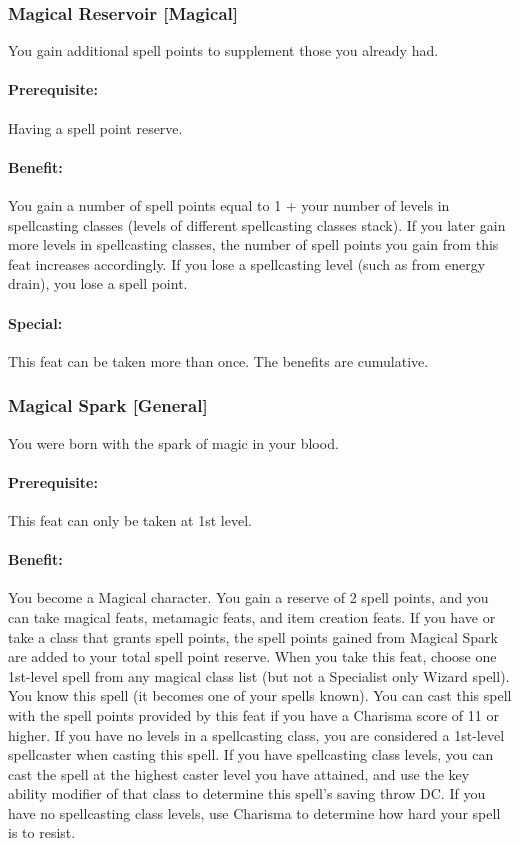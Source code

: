 \subsubsection[Magical Reservoir]{Magical Reservoir [Magical]}
\label{Feat:MagicallyGifted}
You gain additional spell points to supplement those you already had.

\paragraph{Prerequisite:} Having a spell point reserve.

\paragraph{Benefit:} You gain a number of spell points equal to 1 + your number of levels in spellcasting classes (levels of different spellcasting classes stack). If you later gain more levels in spellcasting classes, the number of spell points you gain from this feat increases accordingly. If you lose a spellcasting level (such as from energy drain), you lose a spell point.

\paragraph{Special:} This feat can be taken more than once. The benefits are cumulative.

\subsubsection[Magical Spark]{Magical Spark [General]}
\label{Feat:MagicalSpark}
You were born with the spark of magic in your blood.

\paragraph{Prerequisite:} This feat can only be taken at 1st level.

\paragraph{Benefit:}
You become a Magical character. You gain a reserve of 2 spell points, and you can take
magical feats, metamagic feats, and item creation feats.
If you have or take a class that grants spell points, the spell
points gained from Magical Spark are added to your total spell
point reserve.
When you take this feat, choose one 1st-level spell from any
magical class list (but not a Specialist only Wizard spell).
You know this spell (it becomes one of your
spells known). You can cast this spell with the spell
points provided by this feat if you have a Charisma score of 11
or higher. If you have no levels in a spellcasting class, you are considered
a 1st-level spellcaster when casting this spell. If you have
spellcasting class levels, you can cast the spell at the highest
caster level you have attained, and use the key ability modifier of that class to determine this spell's saving throw DC.
If you have no spellcasting class levels, use Charisma to determine how hard your spell is to resist.

